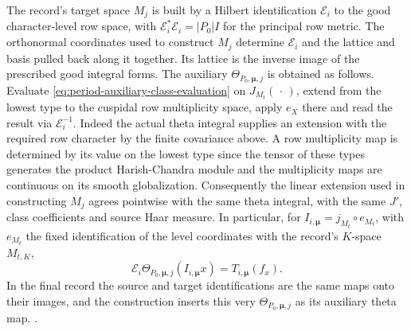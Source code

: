 The record's target space \(M_j\) is built by a Hilbert
identification \(\mathcal E_i\) to the good character-level
row space, with \(\mathcal E_i^*\mathcal E_i=|P_0|I\) for the
principal row metric. The orthonormal coordinates used to
construct \(M_j\) determine \(\mathcal E_i\) and the lattice
and basis pulled back along it together. Its lattice is the
inverse image of the prescribed good integral forms. The auxiliary
\(\Theta_{P_0,\boldsymbol\mu,j}\) is obtained as follows.
Evaluate \eqref{eq:period-auxiliary-class-evaluation} on
\(J_{M_t}(\,\cdot\,)\), extend from the lowest type to the
cuspidal row multiplicity space, apply \(e_X\) there and
read the result via \(\mathcal E_i^{-1}\).
Indeed the actual theta integral supplies an extension with
the required row character by the finite covariance above.
A row multiplicity map is determined by its value on the
lowest type since the tensor of these types generates the
product Harish-Chandra module and the multiplicity maps are
continuous on its smooth globalization. Consequently the
linear extension used in constructing \(M_j\) agrees
pointwise with the same theta integral, with the same
\(J'\), class coefficients and source Haar measure.
In particular, for \(I_{i,\boldsymbol\mu}
=j_{M_t}\circ e_{M_t}\), with \(e_{M_t}\) the fixed
identification of the level coordinates with the record's
\(K\)-space \(M_{t,K}\),
\begin{equation}
 \label{eq:period-auxiliary-record-read}
 \mathcal E_i\Theta_{P_0,\boldsymbol\mu,j}(I_{i,\boldsymbol\mu}x)
       = T_{i,\boldsymbol\mu}(f_x).
\end{equation}
In the final record the source and target identifications are
the same maps onto their images, and the construction inserts
this very \(\Theta_{P_0,\boldsymbol\mu,j}\) as its auxiliary
theta map.
.

